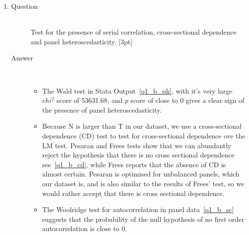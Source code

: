 \documentclass{article}
\begin{document}
\begin{enumerate}
\begin{enumerate}[label=(\alph*)]
\begin{description}
\begin{itemize}
      \end{itemize}
      
    \end{description}
    
    \newpage
    \newpage
    \item %
    \begin{description}
      \item[Question] \hfill \\
      Test for the presence of serial correlation, cross-sectional dependence and panel heteroscedasticity. [3pt]
      \item[Answer] \hfill \\
      \begin{itemize}
        \item The Wald test in Stata Output~\ref{q1_b_ph}, with it's very large \(chi^2\) score of 53631.68, and \(p\) score of close to 0 gives a clear sign of the presence of panel heteroscedasticity.
        \begin{figure}[h]
        
        \end{figure}
        \item Because N is larger than T in our dataset, we use a cross-sectional dependence (CD) test to test for cross-sectional dependence ove the LM test. Pesaran and Frees tests show that we can abundantly reject the hypothesis that there is no cross sectional dependence see~\ref{q1_b_cd}, while Frees reports that the absence of CD is almost certain. Pesaran is optimised for unbalanced panels, which our dataset is, and is also similar to the results of Frees' test, so we would rather accept that there is cross sectional dependence.
      \begin{figure}[h]
      
      \end{figure}
      \item The Woolridge test for autocorrelation in panel data~\ref{q1_b_sc} suggests that the probability of the null hypothesis of no first order autocorrelation is close to 0.
      \begin{figure}[h]
      
      \end{figure}
      \end{itemize}
    \end{description}
    

\end{enumerate}
\end{enumerate}
\end{document}
